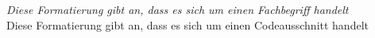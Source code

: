 

\newcommand{\fachbegriff}[1]{\emph{#1}}
\fachbegriff{Diese Formatierung gibt an, dass es sich um einen Fachbegriff handelt}\\
\newcommand{\code}[1]{{\selectfont #1}}
\code{Diese Formatierung gibt an, dass es sich um einen Codeausschnitt handelt}

